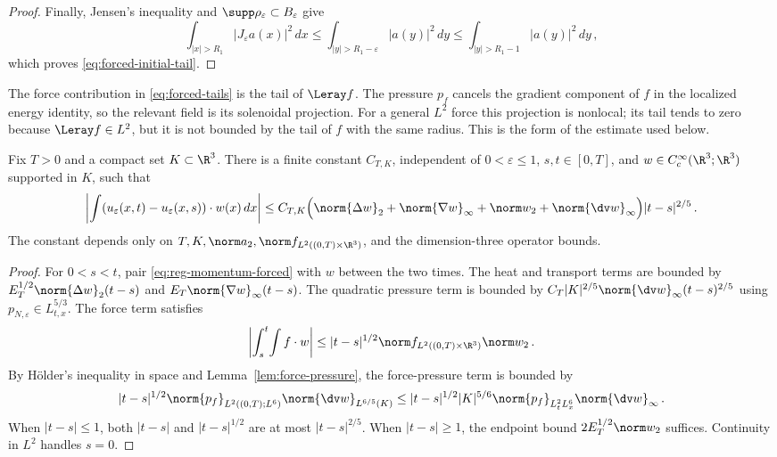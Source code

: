\documentclass[11pt,reqno]{amsart}
\begin{document}
\begin{proof}
Finally, Jensen's inequality and
$\supp\rho_\varepsilon\subset B_\varepsilon$ give
\[
 \int_{|x|>R_1}|J_\varepsilon a(x)|^2\,dx
 \le\int_{|y|>R_1-\varepsilon}|a(y)|^2\,dy
 \le\int_{|y|>R_1-1}|a(y)|^2\,dy\,,
\]
which proves \eqref{eq:forced-initial-tail}.
\end{proof}

\begin{remark}
The force contribution in \eqref{eq:forced-tails} is the tail of $\Leray f$.
The pressure $p_f$ cancels the gradient component of $f$ in the localized
energy identity, so the relevant field is its solenoidal projection. For a
general $L^2$ force this projection is nonlocal; its tail tends to zero
because $\Leray f\in L^2$, but it is not bounded by the tail of $f$ with the
same radius. This is the form of the estimate used below.
\end{remark}

\begin{lemma}\label{lem:forced-equicontinuity}
Fix $T>0$ and a compact set $K\subset\R^3$. There is a finite constant
$C_{T,K}$, independent of $0<\varepsilon\le1$, $s,t\in[0,T]$, and
$w\in C_c^\infty(\R^3;\R^3)$ supported in $K$, such that
\begin{equation}\label{eq:forced-time-modulus}
 \left|\int (u_\varepsilon(x,t)-u_\varepsilon(x,s))\cdot w(x)\,dx\right|
 \le C_{T,K}\Bigl(\norm{\Delta w}_2+\norm{\nabla w}_{\infty}
   +\norm w_2+\norm{\dv w}_{\infty}\Bigr)|t-s|^{2/5}\,.
\end{equation}
The constant depends only on $T,K,\norm a_2,\norm f_{L^2((0,T)\times\R^3)}$,
and the dimension-three operator bounds.
\end{lemma}

\begin{proof}
For $0<s<t$, pair \eqref{eq:reg-momentum-forced} with $w$ between the two
times. The heat and transport terms are bounded by
$E_T^{1/2}\norm{\Delta w}_2(t-s)$ and
$E_T\norm{\nabla w}_{\infty}(t-s)$. The quadratic pressure term is bounded
by $C_T|K|^{2/5}\norm{\dv w}_{\infty}(t-s)^{2/5}$ using
$p_{N,\varepsilon}\in L^{5/3}_{t,x}$. The force term satisfies
\[
 \left|\int_s^t\!\int f\cdot w\right|
 \le |t-s|^{1/2}\norm f_{L^2((0,T)\times\R^3)}\norm w_2\,.
\]
By H\"older's inequality in space and Lemma~\ref{lem:force-pressure},
the force-pressure term is bounded by
\[
 |t-s|^{1/2}\norm{p_f}_{L^2((0,T);L^6)}
     \norm{\dv w}_{L^{6/5}(K)}
 \le |t-s|^{1/2}|K|^{5/6}\norm{p_f}_{L^2_tL^6_x}
     \norm{\dv w}_{\infty}\,.
\]
When $|t-s|\le1$, both $|t-s|$ and $|t-s|^{1/2}$ are at most
$|t-s|^{2/5}$. When $|t-s|\ge1$, the endpoint bound
$2E_T^{1/2}\norm w_2$ suffices. Continuity in $L^2$ handles $s=0$.
\end{proof}
\end{document}
